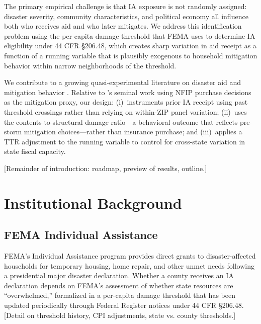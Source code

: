 \documentclass[12pt]{article}
\newcommand{\IA}{\textrm{IA}}
\begin{document}
The primary empirical challenge is that \IA{} exposure is not randomly assigned:
disaster severity, community characteristics, and political economy all influence
both who receives aid and who later mitigates.
We address this identification problem using the per-capita damage threshold that
FEMA uses to determine \IA{} eligibility under 44 CFR \S{}206.48, which creates
sharp variation in aid receipt as a function of a running variable that is
plausibly exogenous to household mitigation behavior within narrow neighborhoods
of the threshold.

We contribute to a growing quasi-experimental literature on disaster aid and
mitigation behavior
\citep{gallagher2014,horn2021,andor2020,botzen2019,davlasheridze2019}.
Relative to \citeauthor{gallagher2014}'s \citeyearpar{gallagher2014} seminal
work using NFIP purchase decisions as the mitigation proxy, our design:
(i)~instruments prior \IA{} receipt using past threshold crossings rather than
relying on within-ZIP panel variation;
(ii)~uses the contents-to-structural damage ratio—a behavioral outcome that
reflects pre-storm mitigation choices—rather than insurance purchase;
and (iii)~applies a TTR adjustment to the running variable to control for
cross-state variation in state fiscal capacity.

[Remainder of introduction: roadmap, preview of results, outline.]

\section{Institutional Background}
\label{sec:background}

\subsection{FEMA Individual Assistance}

FEMA's Individual Assistance program provides direct grants to disaster-affected
households for temporary housing, home repair, and other unmet needs following a
presidential major disaster declaration.
Whether a county receives an \IA{} declaration depends on FEMA's assessment of
whether state resources are ``overwhelmed,'' formalized in a per-capita damage
threshold that has been updated periodically through Federal Register notices
under 44 CFR \S{}206.48.
[Detail on threshold history, CPI adjustments, state vs. county thresholds.]
\end{document}
